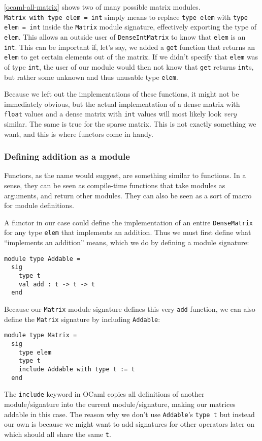 \autoref{ocaml-all-matrix} shows two of many possible matrix modules. \\ \verb|Matrix with type elem = int| simply means to replace \verb|type elem| with \verb|type elem = int| inside the \verb|Matrix| module signature, effectively exporting the type of \verb|elem|. This allows an outside user of \verb|DenseIntMatrix| to know that \verb|elem| is an \verb|int|. This can be important if, let's say, we added a \verb|get| function that returns an \verb|elem| to get certain elements out of the matrix. If we didn't specify that \verb|elem| was of type \verb|int|, the user of our module would then not know that \verb|get| returns \verb|int|s, but rather some unknown and thus unusable type \verb|elem|.

Because we left out the implementations of these functions, it might not be immediately obvious, but the actual implementation of a dense matrix with \verb|float| values and a dense matrix with \verb|int| values will most likely look \textit{very} similar. The same is true for the sparse matrix. This is not exactly something we want, and this is where functors come in handy.

\subsubsection{Defining addition as a module}

Functors, as the name would suggest, are something similar to functions. In a sense, they can be seen as compile-time functions that take modules as arguments, and return other modules. They can also be seen as a sort of macro for module definitions.

A functor in our case could define the implementation of an entire \verb|DenseMatrix| for any type \verb|elem| that implements an addition. Thus we must first define what ``implements an addition'' means, which we do by defining a module signature:
\begin{verbatim}
module type Addable =
  sig
    type t
    val add : t -> t -> t
  end
\end{verbatim}
Because our \verb|Matrix| module signature defines this very \verb|add| function, we can also define the \verb|Matrix| signature by including \verb|Addable|:
\begin{verbatim}
module type Matrix =
  sig
    type elem
    type t
    include Addable with type t := t
  end
\end{verbatim}
The \verb|include| keyword in OCaml copies all definitions of another module/signature into the current module/signature, making our matrices addable in this case. The reason why we don't use \verb|Addable|'s \verb|type t| but instead our own is because we might want to add signatures for other operators later on which should all share the same \verb|t|.

